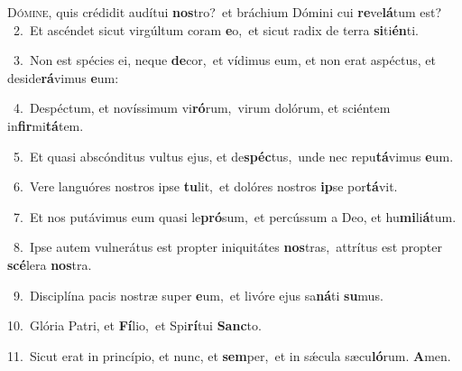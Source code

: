 \lettrine{\initial\textcolor{\initialcolor}{D}}{ómine,} quis crédidit audítui \textbf{nos}\-tro?~\star et bráchium Dómini cui \textbf{re}\-ve\-\textbf{lá}\-tum est?\\
{\numbfont\textcolor{\numbcolor}{~2.}}~Et ascéndet sicut virgúltum coram \textbf{e}\-o,~\star et sicut radix de terra \textbf{si}\-ti\-\textbf{én}\-ti.\par
{\numbfont\textcolor{\numbcolor}{~3.}}~Non est spécies ei, neque \textbf{de}\-cor,~\star et vídimus eum, et non erat aspéctus, et deside\-\textbf{rá}\-vimus \textbf{e}\-um:\par
{\numbfont\textcolor{\numbcolor}{~4.}}~Despéctum, et novíssimum vi\-\textbf{ró}\-rum,~\star virum dolórum, et sciéntem in\-\textbf{fir}\-mi\-\textbf{tá}\-tem.\par
{\numbfont\textcolor{\numbcolor}{~5.}}~Et quasi abscónditus vultus ejus, et de\-\textbf{spéc}\-tus,~\star unde nec repu\-\textbf{tá}\-vimus \textbf{e}\-um.\par
{\numbfont\textcolor{\numbcolor}{~6.}}~Vere languóres nostros ipse \textbf{tu}\-lit,~\star et dolóres nostros \textbf{ip}\-se por\-\textbf{tá}\-vit.\par
{\numbfont\textcolor{\numbcolor}{~7.}}~Et nos putávimus eum quasi le\-\textbf{pró}\-sum,~\star et percússum a Deo, et hu\-\textbf{mi}\-li\-\textbf{á}\-tum.\par
{\numbfont\textcolor{\numbcolor}{~8.}}~Ipse autem vulnerátus est propter iniquitátes \textbf{nos}\-tras,~\star attrítus est propter \textbf{scé}\-lera \textbf{nos}\-tra.\par
{\numbfont\textcolor{\numbcolor}{~9.}}~Disciplína pacis nostræ super \textbf{e}\-um,~\star et livóre ejus sa\-\textbf{ná}\-ti \textbf{su}\-mus.\par
{\numbfont\textcolor{\numbcolor}{10.}}~Glória Patri, et \textbf{Fí}\-lio,~\star et Spi\-\textbf{rí}\-tui \textbf{Sanc}\-to.\par
{\numbfont\textcolor{\numbcolor}{11.}}~Sicut erat in princípio, et nunc, et \textbf{sem}\-per,~\star et in sǽcula sæcu\-\textbf{ló}\-rum. \textbf{A}\-men.\par
